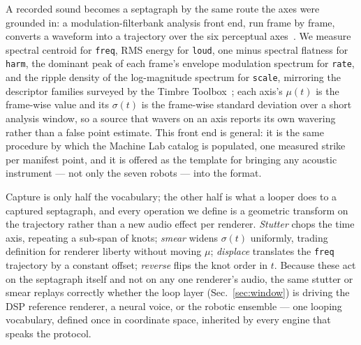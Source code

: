 
A recorded sound becomes a septagraph by the same route the axes were
grounded in: a modulation-filterbank analysis front end, run frame by
frame, converts a waveform into a trajectory over the six perceptual
axes~\cite{shamma,mcdermott}. We measure spectral centroid for
\texttt{freq}, RMS energy for \texttt{loud}, one minus spectral
flatness for \texttt{harm}, the dominant peak of each frame's envelope
modulation spectrum for \texttt{rate}, and the ripple density of the
log-magnitude spectrum for \texttt{scale}, mirroring the descriptor
families surveyed by the Timbre Toolbox~\cite{peeters2011}; each axis's
$\mu(t)$ is the frame-wise value and its $\sigma(t)$ is the frame-wise
standard deviation over a short analysis window, so a source that
wavers on an axis reports its own wavering rather than a false point
estimate. This front end is general: it is the same procedure by which
the Machine Lab catalog is populated, one measured strike per
manifest point, and it is offered as the template for bringing any
acoustic instrument --- not only the seven robots --- into the format.

Capture is only half the vocabulary; the other half is what a looper
does to a captured septagraph, and every operation we define is a
geometric transform on the trajectory rather than a new audio effect
per renderer. \emph{Stutter} chops the time axis, repeating a sub-span
of knots; \emph{smear} widens $\sigma(t)$ uniformly, trading definition
for renderer liberty without moving $\mu$; \emph{displace} translates
the \texttt{freq} trajectory by a constant offset; \emph{reverse} flips
the knot order in $t$. Because these act on the septagraph itself and
not on any one renderer's audio, the same stutter or smear replays
correctly whether the loop layer (Sec.~\ref{sec:window}) is driving the
DSP reference renderer, a neural voice, or the robotic ensemble ---
one looping vocabulary, defined once in coordinate space, inherited by
every engine that speaks the protocol.

